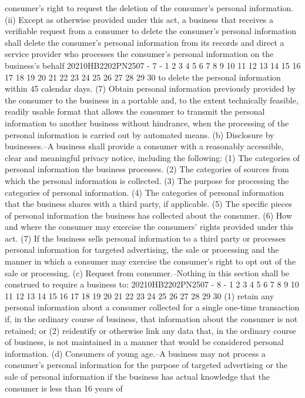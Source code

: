 consumer's right to request the deletion of the
consumer's personal information.
(ii) Except as otherwise provided under this act, a
business that receives a verifiable request from a
consumer to delete the consumer's personal information
shall delete the consumer's personal information from its
records and direct a service provider who processes the
consumer's personal information on the business's behalf
20210HB2202PN2507 - 7 -
1
2
3
4
5
6
7
8
9
10
11
12
13
14
15
16
17
18
19
20
21
22
23
24
25
26
27
28
29
30
to delete the personal information within 45 calendar
days.
(7) Obtain personal information previously provided by
the consumer to the business in a portable and, to the extent
technically feasible, readily usable format that allows the
consumer to transmit the personal information to another
business without hindrance, when the processing of the
personal information is carried out by automated means.
(b) Disclosure by businesses.--A business shall provide a
consumer with a reasonably accessible, clear and meaningful
privacy notice, including the following:
(1) The categories of personal information the business
processes.
(2) The categories of sources from which the personal
information is collected.
(3) The purpose for processing the categories of
personal information.
(4) The categories of personal information that the
business shares with a third party, if applicable.
(5) The specific pieces of personal information the
business has collected about the consumer.
(6) How and where the consumer may exercise the
consumers' rights provided under this act.
(7) If the business sells personal information to a
third party or processes personal information for targeted
advertising, the sale or processing and the manner in which a
consumer may exercise the consumer's right to opt out of the
sale or processing.
(c) Request from consumer.--Nothing in this section shall be
construed to require a business to:
20210HB2202PN2507 - 8 -
1
2
3
4
5
6
7
8
9
10
11
12
13
14
15
16
17
18
19
20
21
22
23
24
25
26
27
28
29
30
(1) retain any personal information about a consumer
collected for a single one-time transaction if, in the
ordinary course of business, that information about the
consumer is not retained; or
(2) reidentify or otherwise link any data that, in the
ordinary course of business, is not maintained in a manner
that would be considered personal information.
(d) Consumers of young age.--A business may not process a
consumer's personal information for the purpose of targeted
advertising or the sale of personal information if the business
has actual knowledge that the consumer is less than 16 years of
